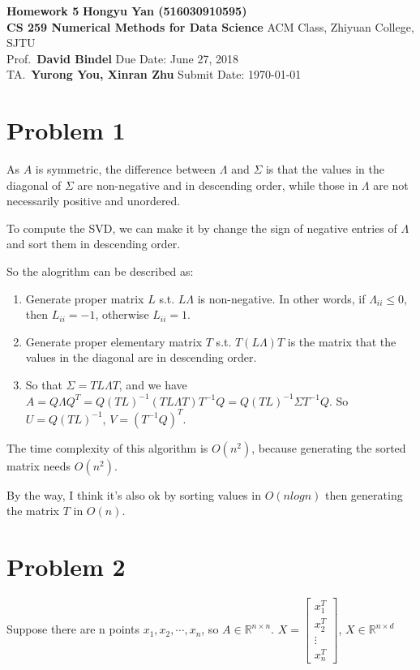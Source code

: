\documentclass[a4paper, 11pt]{article}
\begin{document}
\noindent
\large\textbf{Homework 5} \hfill \textbf{Hongyu Yan (516030910595)} \\
\normalsize {\bf CS 259 Numerical Methods for Data Science} \hfill ACM Class, Zhiyuan College, SJTU\\
Prof.~{\bf David Bindel} \hfill Due Date: June 27, 2018\\
TA.~{\bf Yurong You, Xinran Zhu} \hfill Submit Date: \today

\section*{Problem 1}
As $A$ is symmetric, the difference between $\Lambda$ and $\Sigma$ is that
the values in the diagonal of $\Sigma$ are non-negative and in descending order,
while those in $\Lambda$ are not necessarily positive and unordered.

To compute the SVD, we can make it by change the sign of negative entries of $\Lambda$
and sort them in descending order. 

So the alogrithm can be described as:
\begin{enumerate}
\item Generate proper matrix $L$ s.t. $L\Lambda$ is non-negative. In other words, if $\Lambda_{ii} \leq 0$, then $L_{ii} = -1$, otherwise $L_{ii} = 1$.
\item Generate proper elementary matrix $T$ s.t. $T(L\Lambda)T$ is the matrix that
the values in the diagonal are in descending order.
\item So that $\Sigma = TL\Lambda T$, and we have $A = Q\Lambda Q^T = Q(TL)^{-1}(TL\Lambda T)T^{-1}Q = Q(TL)^{-1}\Sigma T^{-1}Q$. So $U = Q(TL)^{-1}$, $V=(T^{-1}Q)^T$.
\end{enumerate}
The time complexity of this algorithm is $O(n^2)$, because generating the sorted matrix needs $O(n^2)$.

By the way, I think it's also ok by sorting values in $O(nlogn)$ then generating the matrix $T$ in $O(n)$.
\section*{Problem 2}

Suppose there are n points $x_1, x_2, \cdots, x_n$, so $A \in \mathbb{R}^{n \times n}$. 
$ X = 
\begin{bmatrix}
x_1^T \\
x_2^T \\
\vdots \\
x_n^T
\end{bmatrix}
$, $X \in \mathbb{R}^{n \times d}$
\end{document}
